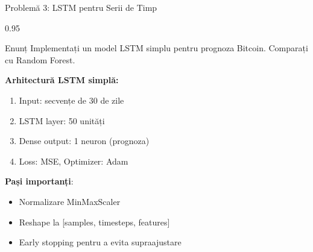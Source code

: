 \documentclass[9pt, aspectratio=169, t]{beamer}
\begin{document}
\begin{frame}{Problemă 3: LSTM pentru Serii de Timp}
    \begin{cminipage}{0.95\textwidth}
    \begin{block}{Enunț}
        Implementați un model LSTM simplu pentru prognoza Bitcoin. Comparați cu Random Forest.
    \end{block}

    \vspace{0.3cm}
    \textbf{Arhitectură LSTM simplă:}
    \begin{enumerate}\setlength{\itemsep}{0pt}
        \item Input: secvențe de 30 de zile
        \item LSTM layer: 50 unități
        \item Dense output: 1 neuron (prognoza)
        \item Loss: MSE, Optimizer: Adam
    \end{enumerate}

    \vspace{0.2cm}
    \textbf{Pași importanți}:
    \begin{itemize}\setlength{\itemsep}{0pt}
        \item Normalizare MinMaxScaler
        \item Reshape la [samples, timesteps, features]
        \item Early stopping pentru a evita supraajustare
    \end{itemize}
    \end{cminipage}
\end{frame}
\end{document}
